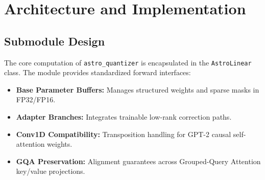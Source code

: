 \section{Architecture and Implementation}

\subsection{Submodule Design}
The core computation of \texttt{astro_quantizer} is encapsulated in the \texttt{AstroLinear} class. The module provides standardized forward interfaces:
\begin{itemize}
\item \textbf{Base Parameter Buffers:} Manages structured weights and sparse masks in FP32/FP16.
\item \textbf{Adapter Branches:} Integrates trainable low-rank correction paths.
\item \textbf{Conv1D Compatibility:} Transposition handling for GPT-2 causal self-attention weights.
\item \textbf{GQA Preservation:} Alignment guarantees across Grouped-Query Attention key/value projections.
\end{itemize}
